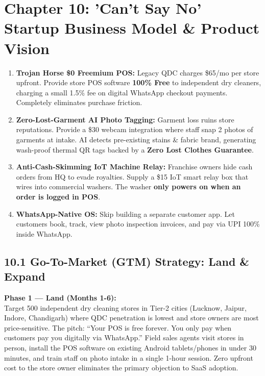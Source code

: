 \documentclass[11pt,a4paper]{article}
\begin{document}
\clearpage

\section{Chapter 10: 'Can't Say No' Startup Business Model \& Product Vision}

\begin{tcolorbox}[colback=greenbg,colframe=greenaccent,title=\textbf{The 4 Irresistible Value Pillars (Disrupting Legacy SaaS):}]
    \begin{enumerate}
        \item \textbf{Trojan Horse \$0 Freemium POS:} Legacy QDC charges \$65/mo per store upfront. Provide store POS software \textbf{100\% Free} to independent dry cleaners, charging a small 1.5\% fee on digital WhatsApp checkout payments. Completely eliminates purchase friction.
        \item \textbf{Zero-Lost-Garment AI Photo Tagging:} Garment loss ruins store reputations. Provide a \$30 webcam integration where staff snap 2 photos of garments at intake. AI detects pre-existing stains \& fabric brand, generating wash-proof thermal QR tags backed by a \textbf{Zero Lost Clothes Guarantee}.
        \item \textbf{Anti-Cash-Skimming IoT Machine Relay:} Franchise owners hide cash orders from HQ to evade royalties. Supply a \$15 IoT smart relay box that wires into commercial washers. The washer \textbf{only powers on when an order is logged in POS}.
        \item \textbf{WhatsApp-Native OS:} Skip building a separate customer app. Let customers book, track, view photo inspection invoices, and pay via UPI 100\% inside WhatsApp.
    \end{enumerate}
\end{tcolorbox}

\subsection{10.1 Go-To-Market (GTM) Strategy: Land \& Expand}

\textbf{Phase 1 --- Land (Months 1-6):}\\
Target 500 independent dry cleaning stores in Tier-2 cities (Lucknow, Jaipur, Indore, Chandigarh) where QDC penetration is lowest and store owners are most price-sensitive. The pitch: ``Your POS is free forever. You only pay when customers pay you digitally via WhatsApp.'' Field sales agents visit stores in person, install the POS software on existing Android tablets/phones in under 30 minutes, and train staff on photo intake in a single 1-hour session. Zero upfront cost to the store owner eliminates the primary objection to SaaS adoption.
\end{document}
